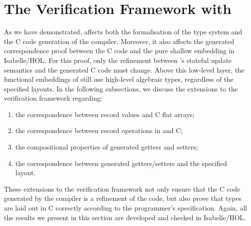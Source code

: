 \section{The Verification Framework with \Dargent}
{\label{sec:verification}}

As we have demonstrated, \Dargent affects both
the formalisation of the type system and the C code generation of the compiler.
Moreover, it also affects the generated correspondence proof between
the C code and the pure shallow embedding in Isabelle/HOL. For this proof,
only the refinement between \Cogent's stateful update semantics
and the generated C code must change.
Above this low-level layer, the functional embeddings of \cogent still use
high-level algebraic types, regardless of the specified layouts.
In the following subsections,
we discuss  the extensions to the verification framework regarding:
\begin{enumerate}
  \item the correspondence between \cogent record values and C flat arrays;
  \item the correspondence between record operations in \cogent and C;
  \item the compositional properties of generated getters and setters;
  \item the correspondence between generated getters/setters and the specified
     layout.
\end{enumerate}
These extensions to the verification framework not only ensure that the C code
generated by the compiler is a refinement of the \cogent code, but also
prove that \cogent types are laid out in C correctly according to the programmer's \dargent
specification. Again, all the results we present in this section are
developed and checked in Isabelle/HOL.


